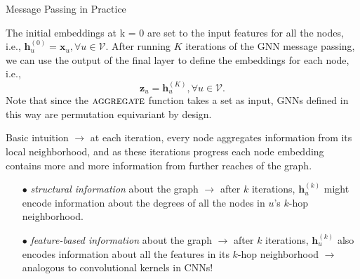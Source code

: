 \documentclass[10pt, aspectratio=169, compress, protectframetitle, handout]{beamer}
\begin{document}
\begin{frame}{Message Passing in Practice}

    The initial embeddings at k = 0 are set to the input features for all the nodes, i.e., $\mathbf h^{(0)}_u = \mathbf x_u, \forall u \in \mathcal V$. After running $K$ iterations of the GNN message passing, we can use the output of the final layer to define the \alert{embeddings} for each node, i.e.,
    \begin{equation}
        \mathbf z_u = \mathbf h^{(K)}_u, \forall u \in \mathcal V.
    \end{equation}
    Note that since the $\textsc{aggregate}$ function takes a set as input, GNNs defined in this way are permutation equivariant by design.
    
    \alert{Basic intuition} $\longrightarrow$ at each iteration, every node aggregates information from its local neighborhood, and as these iterations progress each node embedding contains more and more information from further reaches of the graph.
    
    \begin{itemize}
        \item[\alert{$\bullet$}] \emph{structural information} about the graph $\longrightarrow$ after $k$ iterations, $\mathbf h^{(k)}_u$ might encode information about the degrees of all the nodes in $u$'s $k$-hop neighborhood.
    
        \item[\alert{$\bullet$}] \emph{feature-based information} about the graph $\longrightarrow$ after $k$ iterations, $\mathbf h^{(k)}_u$ also encodes information about all the features in its $k$-hop neighborhood $\rightarrow$ analogous to convolutional kernels in CNNs!
    \end{itemize}
    
\end{frame}
\end{document}
